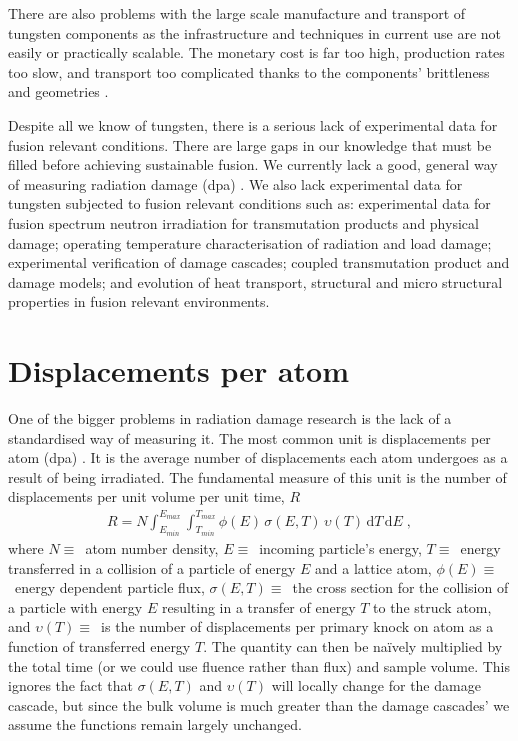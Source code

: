 \documentclass[12pt, a4paper]{article}
\begin{document}
		There are also problems with the large scale manufacture and transport of tungsten components as the infrastructure and techniques in current use are not easily or practically scalable. The monetary cost is far too high, production rates too slow, and transport too complicated thanks to the components' brittleness and geometries \cite{manufacture}.
		
		Despite all we know of tungsten, there is a serious lack of experimental data for fusion relevant conditions. There are large gaps in our knowledge that must be filled before achieving sustainable fusion. We currently lack a good, general way of measuring radiation damage (dpa) \cite{srimisbad}. We also lack experimental data for tungsten subjected to fusion relevant conditions \cite{ifmif} such as: experimental data for fusion spectrum neutron irradiation for transmutation products and physical damage; operating temperature characterisation of radiation and load damage; experimental verification of damage cascades; coupled transmutation product and damage models; and evolution of heat transport, structural and micro structural properties in fusion relevant environments.
	\section{Displacements per atom}\label{s:dpa}
		One of the bigger problems in radiation damage research is the lack of a standardised way of measuring it. The most common unit is displacements per atom (dpa) \cite{dpa}. It is the average number of displacements each atom undergoes as a result of being irradiated. The fundamental measure of this unit is the number of displacements per unit volume per unit time, $R$
		\begin{align}
			R=N\int _{E_{min}}^{E_{max}}\int _{T_{min}}^{T_{max}}\phi (E)\,\sigma (E,T)\,\upsilon (T)\,\mathrm{d}T\,\mathrm{d}E\;,
		\end{align}
		where $N \equiv$~atom number density, $E \equiv$~incoming particle's energy, $T \equiv$~energy transferred in a collision of a particle of energy $E$ and a lattice atom, $\phi (E) \equiv$~energy dependent particle flux, $\sigma (E,T) \equiv$~the cross section for the collision of a particle with energy $E$ resulting in a transfer of energy $T$ to the struck atom, and $\upsilon (T) \equiv$~is the number of displacements per primary knock on atom as a function of transferred energy $T$. The quantity can then be na\"{i}vely multiplied by the total time (or we could use fluence rather than flux) and sample volume. This ignores the fact that $\sigma (E,T)$ and $\upsilon (T)$ will locally change for the damage cascade, but since the bulk volume is much greater than the damage cascades' we assume the functions remain largely unchanged.
		
\end{document}
